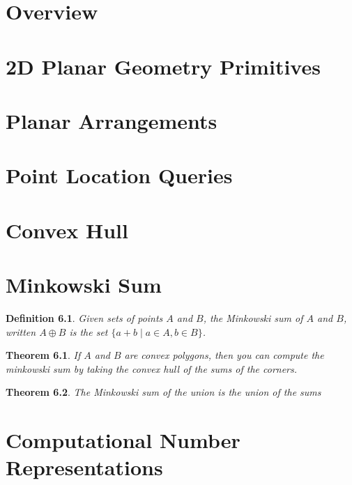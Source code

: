 \newtheorem{definition}{Definition}
\newtheorem{theorem}{Theorem}
\newtheorem{lemma}{Lemma}
\newtheorem{corollary}{Corollary}

\chapter{Overview}

\chapter{2D Planar Geometry Primitives}

\chapter{Planar Arrangements}

\chapter{Point Location Queries}

\chapter{Convex Hull}

\chapter{Minkowski Sum}

\begin{definition}
  \label{def:minkowski}
  Given sets of points $A$ and $B$, the Minkowski sum of $A$ and $B$, written
  $A ⊕ B$ is the set $\{a + b \mid a ∈ A, b ∈ B\}$.
\end{definition}

\begin{theorem}
  \notready
  If $A$ and $B$ are convex polygons, then you can compute the minkowski sum by
  taking the convex hull of the sums of the corners.
\end{theorem}

\begin{theorem}
  \notready
  The Minkowski sum of the union is the union of the sums
\end{theorem}

\chapter{Computational Number Representations}


